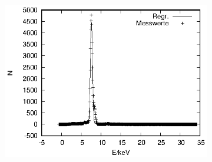 \begin{figure}[!h]
\begin{subfigure}[h]{0.5\textwidth}
  \end{subfigure}%
  \begin{subfigure}[h]{0.5\textwidth}
    \centering
    \includegraphics{data/Massenanteil/ni.eps}
  \end{subfigure}
\end{figure}


